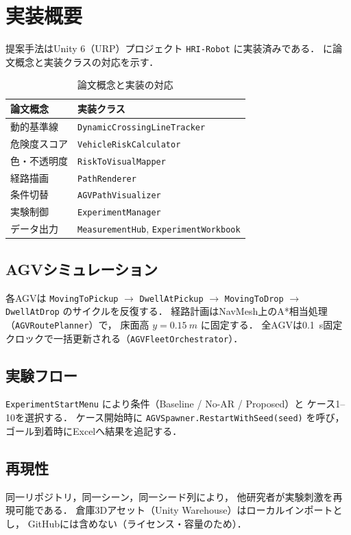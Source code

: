 \section{実装概要}
\label{sec:implementation}

提案手法はUnity 6（URP）プロジェクト \texttt{HRI-Robot} に実装済みである．
に論文概念と実装クラスの対応を示す．

\begin{table}[htbp]
  \centering
  \caption{論文概念と実装の対応}
  \label{tab:impl}
  \begin{tabular}{ll}
    \toprule
    論文概念 & 実装クラス \\
    \midrule
    動的基準線 & \texttt{DynamicCrossingLineTracker} \\
    危険度スコア & \texttt{VehicleRiskCalculator} \\
    色・不透明度 & \texttt{RiskToVisualMapper} \\
    経路描画 & \texttt{PathRenderer} \\
    条件切替 & \texttt{AGVPathVisualizer} \\
    実験制御 & \texttt{ExperimentManager} \\
    データ出力 & \texttt{MeasurementHub}, \texttt{ExperimentWorkbook} \\
    \bottomrule
  \end{tabular}
\end{table}

\subsection{AGVシミュレーション}

各AGVは \texttt{MovingToPickup} $\rightarrow$ \texttt{DwellAtPickup}
$\rightarrow$ \texttt{MovingToDrop} $\rightarrow$ \texttt{DwellAtDrop}
のサイクルを反復する．
経路計画はNavMesh上のA*相当処理（\texttt{AGVRoutePlanner}）で，
床面高 $y=\SI{0.15}{m}$ に固定する．
全AGVは\SI{0.1}{s}固定クロックで一括更新される（\texttt{AGVFleetOrchestrator}）．

\subsection{実験フロー}

\texttt{ExperimentStartMenu} により条件（Baseline / No-AR / Proposed）と
ケース1--10を選択する．
ケース開始時に \texttt{AGVSpawner.RestartWithSeed(seed)} を呼び，
ゴール到着時にExcelへ結果を追記する．

\subsection{再現性}

同一リポジトリ，同一シーン，同一シード列により，
他研究者が実験刺激を再現可能である．
倉庫3Dアセット（Unity Warehouse）はローカルインポートとし，
GitHubには含めない（ライセンス・容量のため）．
